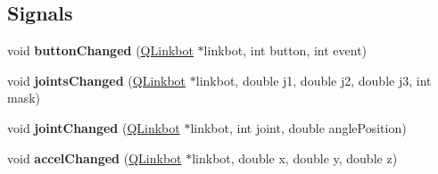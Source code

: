 \subsection*{Signals}
\begin{DoxyCompactItemize}
\item 
\hypertarget{class_q_linkbot_afff0d6647281757fa2a064d9e25b26d6}{void {\bfseries button\-Changed} (\hyperlink{class_q_linkbot}{Q\-Linkbot} $\ast$linkbot, int button, int event)}\label{class_q_linkbot_afff0d6647281757fa2a064d9e25b26d6}

\item 
\hypertarget{class_q_linkbot_ac5601889a86f48fc609dfb98cbd8a15e}{void {\bfseries joints\-Changed} (\hyperlink{class_q_linkbot}{Q\-Linkbot} $\ast$linkbot, double j1, double j2, double j3, int mask)}\label{class_q_linkbot_ac5601889a86f48fc609dfb98cbd8a15e}

\item 
\hypertarget{class_q_linkbot_abd078d585f5b7c251aac051f4d74d5f2}{void {\bfseries joint\-Changed} (\hyperlink{class_q_linkbot}{Q\-Linkbot} $\ast$linkbot, int joint, double angle\-Position)}\label{class_q_linkbot_abd078d585f5b7c251aac051f4d74d5f2}

\item 
\hypertarget{class_q_linkbot_ac35fe57149cabea92c491db247a722e9}{void {\bfseries accel\-Changed} (\hyperlink{class_q_linkbot}{Q\-Linkbot} $\ast$linkbot, double x, double y, double z)}\label{class_q_linkbot_ac35fe57149cabea92c491db247a722e9}

\end{DoxyCompactItemize}
